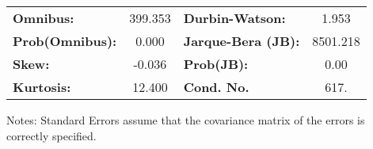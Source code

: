 \begin{center}
\begin{tabular}{lcccccc}
\bottomrule
\end{tabular}
\begin{tabular}{lclc}
\textbf{Omnibus:}       & 399.353 & \textbf{  Durbin-Watson:     } &    1.953  \\
\textbf{Prob(Omnibus):} &   0.000 & \textbf{  Jarque-Bera (JB):  } & 8501.218  \\
\textbf{Skew:}          &  -0.036 & \textbf{  Prob(JB):          } &     0.00  \\
\textbf{Kurtosis:}      &  12.400 & \textbf{  Cond. No.          } &     617.  \\
\bottomrule
\end{tabular}
\end{center}

Notes: \newline
 [1] Standard Errors assume that the covariance matrix of the errors is correctly specified.